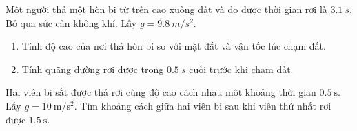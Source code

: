 \begin{ex}
	Một người thả một hòn bi từ trên cao xuống đất và đo được thời gian rơi là $\SI{3,1}{s}$. Bỏ qua sức cản không khí. Lấy $g=\SI{9,8}{m/s^2}$.
	\begin{enumerate}[label=\alph*)]
		\item Tính độ cao của nơi thả hòn bi so với mặt đất và vận tốc lúc chạm đất.
		\item Tính quãng đường rơi được trong $\SI{0,5}{s}$ cuối trước khi chạm đất.
	\end{enumerate}
\end{ex}

\begin{ex}
	Hai viên bi sắt được thả rơi cùng độ cao cách nhau một khoảng thời gian $\SI{0,5}{\second}$. Lấy $g = \SI{10}{\meter/\second^2}$. Tìm khoảng cách giữa hai viên bi sau khi viên thứ nhất rơi được $\SI{1,5}{\second}$.
\end{ex}

